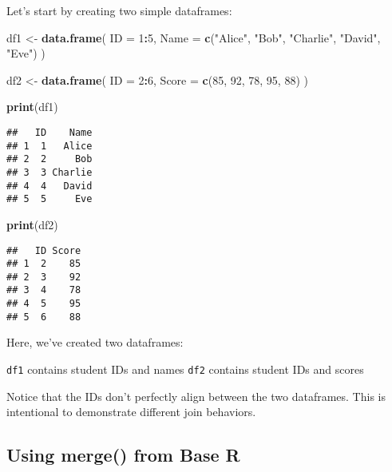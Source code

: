 \documentclass[
]{article}
\newenvironment{Shaded}{\begin{snugshade}}{\end{snugshade}}
\newcommand{\AttributeTok}[1]{\textcolor[rgb]{0.13,0.29,0.53}{#1}}
\newcommand{\DecValTok}[1]{\textcolor[rgb]{0.00,0.00,0.81}{#1}}
\newcommand{\FunctionTok}[1]{\textcolor[rgb]{0.13,0.29,0.53}{\textbf{#1}}}
\newcommand{\NormalTok}[1]{#1}
\newcommand{\OtherTok}[1]{\textcolor[rgb]{0.56,0.35,0.01}{#1}}
\newcommand{\SpecialCharTok}[1]{\textcolor[rgb]{0.81,0.36,0.00}{\textbf{#1}}}
\newcommand{\StringTok}[1]{\textcolor[rgb]{0.31,0.60,0.02}{#1}}
\begin{document}
Let's start by creating two simple dataframes:

\begin{Shaded}
\begin{Highlighting}[]
\NormalTok{df1 }\OtherTok{\textless{}{-}} \FunctionTok{data.frame}\NormalTok{(}
  \AttributeTok{ID =} \DecValTok{1}\SpecialCharTok{:}\DecValTok{5}\NormalTok{,}
  \AttributeTok{Name =} \FunctionTok{c}\NormalTok{(}\StringTok{"Alice"}\NormalTok{, }\StringTok{"Bob"}\NormalTok{, }\StringTok{"Charlie"}\NormalTok{, }\StringTok{"David"}\NormalTok{, }\StringTok{"Eve"}\NormalTok{)}
\NormalTok{)}

\NormalTok{df2 }\OtherTok{\textless{}{-}} \FunctionTok{data.frame}\NormalTok{(}
  \AttributeTok{ID =} \DecValTok{2}\SpecialCharTok{:}\DecValTok{6}\NormalTok{,}
  \AttributeTok{Score =} \FunctionTok{c}\NormalTok{(}\DecValTok{85}\NormalTok{, }\DecValTok{92}\NormalTok{, }\DecValTok{78}\NormalTok{, }\DecValTok{95}\NormalTok{, }\DecValTok{88}\NormalTok{)}
\NormalTok{)}

\FunctionTok{print}\NormalTok{(df1)}
\end{Highlighting}
\end{Shaded}

\begin{verbatim}
##   ID    Name
## 1  1   Alice
## 2  2     Bob
## 3  3 Charlie
## 4  4   David
## 5  5     Eve
\end{verbatim}

\begin{Shaded}
\begin{Highlighting}[]
\FunctionTok{print}\NormalTok{(df2)}
\end{Highlighting}
\end{Shaded}

\begin{verbatim}
##   ID Score
## 1  2    85
## 2  3    92
## 3  4    78
## 4  5    95
## 5  6    88
\end{verbatim}

Here, we've created two dataframes:

\texttt{df1} contains student IDs and names \texttt{df2} contains
student IDs and scores

Notice that the IDs don't perfectly align between the two dataframes.
This is intentional to demonstrate different join behaviors.

\hypertarget{using-merge-from-base-r}{%
\subsection{Using merge() from Base R}\label{using-merge-from-base-r}}
\end{document}
